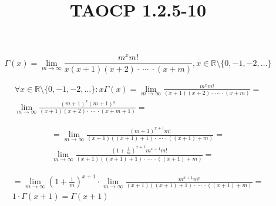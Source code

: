 \documentclass{article}
\title{TAOCP 1.2.5\mbox{-}10}
\begin{document}
\maketitle

\[ \Gamma(x) = \lim_{m\to\infty} \frac{m^{x}m!}{x(x+1)(x+2) \cdot\ \cdots\ \cdot (x+m)}, x \in \mathbb{R} \setminus \{ 0, -1, -2, \ldots \} \]

\begin{multline*}
\forall x \in \mathbb{R} \setminus \{ 0, -1, -2, \ldots \}: x\Gamma(x) = \lim_{m\to\infty} \frac{m^{x}m!}{(x+1)(x+2) \cdot\ \cdots\ \cdot (x+m)} = \\
\lim_{m\to\infty} \frac{{(m+1)}^{x}(m+1)!}{(x+1)(x+2) \cdot\ \cdots\ \cdot (x+m+1)} =
\end{multline*}

\begin{multline*}
= \lim_{m\to\infty}\frac{{(m+1)}^{x+1}m!}{(x+1)((x+1)+1) \cdot\ \cdots\ \cdot ((x+1)+m)} = \\
\lim_{m\to\infty}\frac{{(1+\frac{1}{m})}^{x+1}m^{x+1}m!}{(x+1)((x+1)+1) \cdot\ \cdots\ \cdot ((x+1)+m)} =
\end{multline*}

\begin{multline*}
= \lim_{m\to\infty}{{(1+\frac{1}{m})}^{x+1}} \cdot \lim_{m\to\infty}\frac{m^{x+1}m!}{(x+1)((x+1)+1) \cdot\ \cdots\ \cdot ((x+1)+m)} = \\
1 \cdot \Gamma(x+1) = \Gamma(x+1)
\end{multline*}
\end{document}

